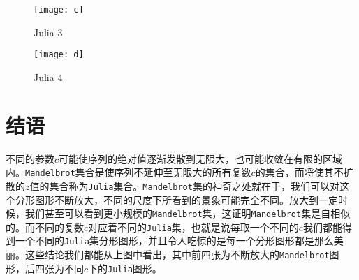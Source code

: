 \documentclass{ctexart}
\begin{document}
\begin{figure}[H]
  \centering
  \begin{minipage}[t]{0.48\textwidth}
    \centering
    \texttt{[image: c]}
    \caption{Julia 3}
  \end{minipage}
  \begin{minipage}[t]{0.48\textwidth}
    \centering
    \texttt{[image: d]}
    \caption{Julia 4}
  \end{minipage}
\end{figure}

\section{结语}
不同的参数$c$可能使序列的绝对值逐渐发散到无限大，也可能收敛在有限的区域内。\verb|Mandelbrot|集合是使序列不延伸至无限大的所有复数$c$的集合，而将使其不扩散的$z$值的集合称为\verb|Julia|集合。\verb|Mandelbrot|集的神奇之处就在于，我们可以对这个分形图形不断放大，不同的尺度下所看到的景象可能完全不同。放大到一定时候，我们甚至可以看到更小规模的\verb|Mandelbrot|集，这证明\verb|Mandelbrot|集是自相似的。而不同的复数$c$对应着不同的\verb|Julia|集，也就是说每取一个不同的$c$我们都能得到一个不同的\verb|Julia|集分形图形，并且令人吃惊的是每一个分形图形都是那么美丽。这些结论我们都能从上图中看出，其中前四张为不断放大的\verb|Mandelbrot|图形，后四张为不同$c$下的\verb|Julia|图形。\cite{lei1990similarity}


\end{document}
